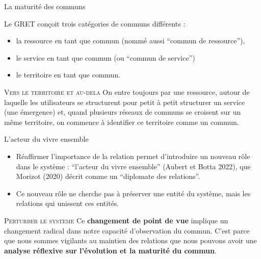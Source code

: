 \documentclass[newPxFont]{beamer}
\begin{document}
\begin{frame}[c]{La maturité des communs}
\vspace{-1cm}

Le GRET conçoit trois catégories de communs différents :
\begin{itemize}
    \item la ressource en tant que commun (nommé aussi “commun de ressource”),
    \item le service en tant que commun (ou “commun de service”)
    \item le territoire en tant que commun.
\end{itemize}

 \small{
   \begin{alertblock}{\textsc{Vers le territoire et au-dela}}
     On entre toujours par une ressource, autour de laquelle les utilisateurs se structurent pour petit à petit structurer un service (une émergence) et, quand plusieurs réseaux de communs se croisent sur un même territoire, on commence à identifier ce territoire comme un commun.
   \end{alertblock}
 }
\end{frame}

\begin{frame}[c]{L'acteur du vivre ensemble}
\vspace{-1cm}

\begin{itemize}
    \item Réaffirmer l’importance de la relation permet d’introduire un nouveau rôle dans le système : “l’acteur du vivre ensemble” (Aubert et Botta 2022), que Morizot (2020) décrit comme un “diplomate des relations”.
    \item Ce nouveau rôle ne cherche pas à préserver une entité du système, mais les relations qui unissent ces entités.
\end{itemize}

 \small{
   \begin{alertblock}{\textsc{Perturber le systeme}}
     Ce \textbf{changement de point de vue} implique un changement radical dans notre capacité d’observation du commun. C’est parce que nous sommes vigilants au maintien des relations que nous pouvons avoir une \textbf{analyse réflexive sur l’évolution et la maturité du commun}.
   \end{alertblock}
 }
\end{frame}
\end{document}
